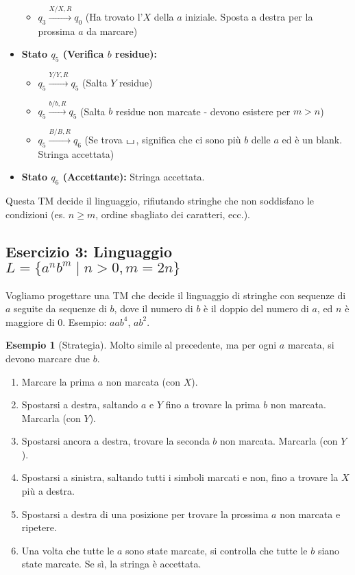 \documentclass[a4paper]{article}
\theoremstyle{definition} %
\newtheorem{example}{Esempio}
\newcommand{\blankS}{\ensuremath{\raisebox{-0.15ex}{\scalebox{1.3}[0.7]{$\sqcup$}}\mkern2mu}}
\begin{document}
\begin{itemize}
\begin{itemize}
            \item $q_3 \xrightarrow{X / X, R} q_0$ (Ha trovato l'$X$ della $a$ iniziale. Sposta a destra per la prossima $a$ da marcare)
        \end{itemize}
    \item \textbf{Stato $q_5$ (Verifica $b$ residue):}
        \begin{itemize}
            \item $q_5 \xrightarrow{Y / Y, R} q_5$ (Salta $Y$ residue)
            \item $q_5 \xrightarrow{b / b, R} q_5$ (Salta $b$ residue non marcate - devono esistere per $m>n$)
            \item $q_5 \xrightarrow{B / B, R} q_6$ (Se trova \blankS, significa che ci sono più $b$ delle $a$ ed è un blank. Stringa accettata)
        \end{itemize}
    \item \textbf{Stato $q_6$ (Accettante):} Stringa accettata.
\end{itemize}
Questa TM decide il linguaggio, rifiutando stringhe che non soddisfano le condizioni (es. $n \ge m$, ordine sbagliato dei caratteri, ecc.).

\subsection{Esercizio 3: Linguaggio $L = \{a^n b^m \mid n > 0, m = 2n\}$}

Vogliamo progettare una TM che decide il linguaggio di stringhe con sequenze di $a$ seguite da sequenze di $b$, dove il numero di $b$ è il doppio del numero di $a$, ed $n$ è maggiore di $0$. Esempio: $aab^{4}$, $ab^{2}$.

\begin{example}[Strategia]
Molto simile al precedente, ma per ogni $a$ marcata, si devono marcare due $b$.
\begin{enumerate}
    \item Marcare la prima $a$ non marcata (con $X$).
    \item Spostarsi a destra, saltando $a$ e $Y$ fino a trovare la prima $b$ non marcata. Marcarla (con $Y$).
    \item Spostarsi ancora a destra, trovare la seconda $b$ non marcata. Marcarla (con $Y$).
    \item Spostarsi a sinistra, saltando tutti i simboli marcati e non, fino a trovare la $X$ più a destra.
    \item Spostarsi a destra di una posizione per trovare la prossima $a$ non marcata e ripetere.
    \item Una volta che tutte le $a$ sono state marcate, si controlla che tutte le $b$ siano state marcate. Se sì, la stringa è accettata.
\end{enumerate}
\end{example}
\end{document}
